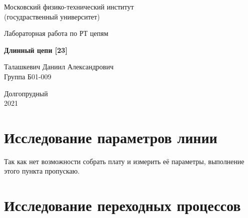 \documentclass[a4paper, 14pt]{extarticle}%
\date{}
\begin{document}
\begin{titlepage}

	\newpage
	\begin{center}
		\normalsize Московский физико-технический институт \\(госудраственный 			университет)
	\end{center}

	\vspace{6em}

	\begin{center}
		\Large Лабораторная работа по РТ цепям\\
	\end{center}

	\vspace{1em}

	\begin{center}
		\large \textbf{Длинный цепи [23]}
	\end{center}

	\vspace{2em}

	\begin{center}
		\large Талашкевич Даниил Александрович\\
		Группа Б01-009
	\end{center}

	\vspace{\fill}

	\begin{center}
	Долгопрудный \\2021
	\end{center}
	
\end{titlepage}



	\thispagestyle{empty}
	\newpage
	\tableofcontents
	\newpage
	\setcounter{page}{1}


\section{Исследование параметров линии}

Так как нет возможности собрать плату и измерить её параметры, выполнение этого пункта пропускаю.

\section{Исследование переходных процессов}
\end{document}
